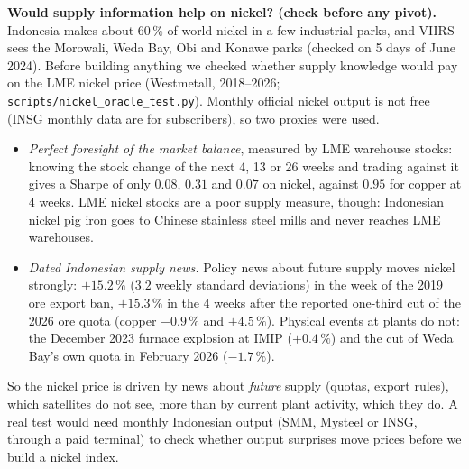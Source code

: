 \documentclass[10pt,a4paper]{article}
\begin{document}
\textbf{Would supply information help on nickel? (check before any pivot).} Indonesia makes about 60\,\% of world nickel in a few industrial parks, and VIIRS sees the Morowali, Weda Bay, Obi and Konawe parks (checked on 5 days of June 2024). Before building anything we checked whether supply knowledge would pay on the LME nickel price (Westmetall, 2018--2026; \texttt{scripts/nickel\_oracle\_test.py}). Monthly official nickel output is not free (INSG monthly data are for subscribers), so two proxies were used.
\begin{itemize}[leftmargin=1.2em]
  \item \emph{Perfect foresight of the market balance}, measured by LME warehouse stocks: knowing the stock change of the next 4, 13 or 26 weeks and trading against it gives a Sharpe of only $0.08$, $0.31$ and $0.07$ on nickel, against $0.95$ for copper at 4 weeks. LME nickel stocks are a poor supply measure, though: Indonesian nickel pig iron goes to Chinese stainless steel mills and never reaches LME warehouses.
  \item \emph{Dated Indonesian supply news.} Policy news about future supply moves nickel strongly: $+15.2\,\%$ ($3.2$ weekly standard deviations) in the week of the 2019 ore export ban, $+15.3\,\%$ in the 4 weeks after the reported one-third cut of the 2026 ore quota (copper $-0.9\,\%$ and $+4.5\,\%$). Physical events at plants do not: the December 2023 furnace explosion at IMIP ($+0.4\,\%$) and the cut of Weda Bay's own quota in February 2026 ($-1.7\,\%$).
\end{itemize}
So the nickel price is driven by news about \emph{future} supply (quotas, export rules), which satellites do not see, more than by current plant activity, which they do. A real test would need monthly Indonesian output (SMM, Mysteel or INSG, through a paid terminal) to check whether output surprises move prices before we build a nickel index.
\end{document}
